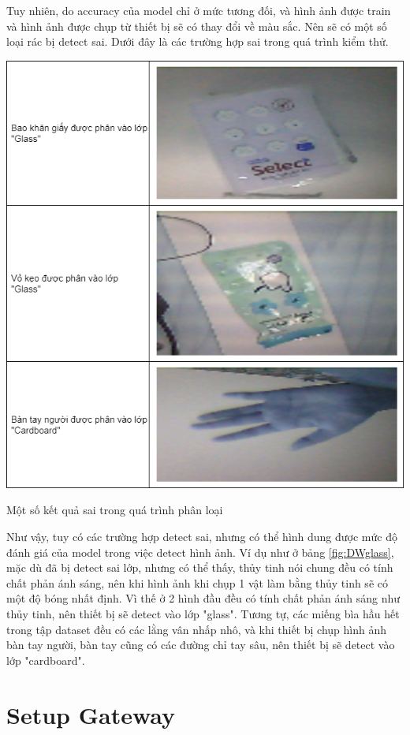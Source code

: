 Tuy nhiên, do accuracy của model chỉ ở mức tương đối, và hình ảnh được train và hình ảnh được chụp từ thiết bị sẽ có thay đổi về màu sắc. Nên sẽ có một số loại rác bị detect sai. Dưới đây là các trường hợp sai trong quá trình kiểm thử.
\begin{table}[H]
    \centering
    \includegraphics[width=\linewidth]{images/Quanh/Trash Failed.png}
    \caption{Một số kết quả sai trong quá trình phân loại}
    \label{fig:DWglass}
\end{table}

Như vậy, tuy có các trường hợp detect sai, nhưng có thể hình dung được mức độ đánh giá của model trong việc detect hình ảnh. Ví dụ như ở bảng \ref{fig:DWglass}, mặc dù đã bị detect sai lớp, nhưng có thể thấy, thủy tinh nói chung đều có tính chất phản ánh sáng, nên khi hình ảnh khi chụp 1 vật làm bằng thủy tinh sẽ có một độ bóng nhất định. Vì thế ở 2 hình đầu  đều có tính chất phản ánh sáng như thủy tinh, nên thiết bị sẽ detect vào lớp "glass". Tương tự, các miếng bìa hầu hết trong tập dataset đều có các lằng vân nhấp nhô, và khi thiết bị chụp hình ảnh bàn tay người, bàn tay cũng có các đường chỉ tay sâu, nên thiết bị sẽ detect vào lớp "cardboard".


\section{Setup Gateway}
